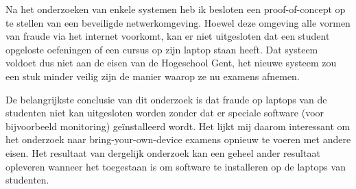Na het onderzoeken van enkele systemen heb ik besloten een proof-of-concept op te stellen van een beveiligde netwerkomgeving. Hoewel deze omgeving alle vormen van fraude via het internet voorkomt, kan er niet uitgesloten dat een student opgeloste oefeningen of een cursus op zijn laptop staan heeft. Dat systeem voldoet dus niet aan de eisen van de Hogeschool Gent, het nieuwe systeem zou een stuk minder veilig zijn de manier waarop ze nu examens afnemen. 

De belangrijkste conclusie van dit onderzoek is dat fraude op laptops van de studenten niet kan uitgesloten worden zonder dat er speciale software (voor bijvoorbeeld monitoring) ge\"{i}nstalleerd wordt. Het lijkt mij daarom interessant om het onderzoek naar bring-your-own-device examens opnieuw te voeren met andere eisen. Het resultaat van dergelijk onderzoek kan een geheel ander resultaat opleveren wanneer het toegestaan is om software te installeren op de laptops van studenten. 

